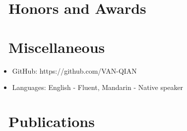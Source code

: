 \documentclass{resume}
\begin{document}
\section{\faHeartO\ Honors and Awards}

\section{\faInfo\ Miscellaneous}
\begin{itemize}[parsep=0.5ex]
  \item GitHub: https://github.com/VAN-QIAN
  \item Languages: English - Fluent, Mandarin - Native speaker
\end{itemize}

\section{\faInfo\ Publications}


\end{document}
